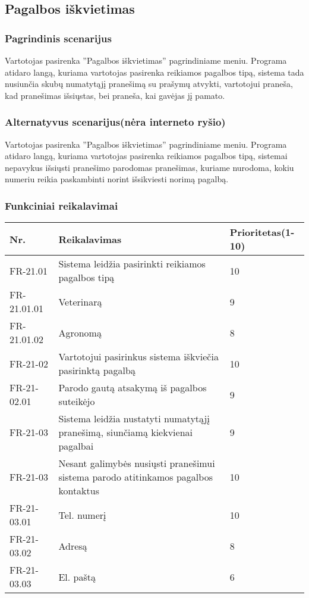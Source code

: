 \documentclass[oneside]{VUMIFPSkursinis}
\begin{document}
\subsection{Pagalbos iškvietimas}
	\subsubsection{Pagrindinis scenarijus}
	Vartotojas pasirenka ''Pagalbos iškvietimas'' pagrindiniame meniu. Programa atidaro langą, kuriama vartotojas pasirenka reikiamos pagalbos tipą, sistema tada nusiunčia skubų numatytąjį pranešimą su prašymų atvykti, vartotojui praneša, kad pranešimas išsiųstas, bei praneša, kai gavėjas jį pamato.
	\subsubsection{Alternatyvus scenarijus(nėra interneto ryšio)}
	Vartotojas pasirenka ''Pagalbos iškvietimas'' pagrindiniame meniu. Programa atidaro langą, kuriama vartotojas pasirenka reikiamos pagalbos tipą, sistemai nepavykus išsiųsti pranešimo parodomas pranešimas, kuriame nurodoma, kokiu numeriu reikia paskambinti norint išsikviesti norimą pagalbą.
	\subsubsection{Funkciniai reikalavimai}
	\begin{table}[htbp]
		\begin{tabularx}{1\textwidth}{ |P{2.5cm}|X|P{3cm }| }  \hline
			Nr. & Reikalavimas & Prioritetas(1-10) \\ \hline
			FR-21.01 & Sistema leidžia pasirinkti reikiamos pagalbos tipą & 10 \\ \hline
			FR-21.01.01 & Veterinarą & 9 \\ \hline
			FR-21.01.02 & Agronomą & 8 \\ \hline
			FR-21-02 & Vartotojui pasirinkus sistema iškviečia pasirinktą pagalbą & 10 \\ \hline	
			FR-21-02.01 & Parodo gautą atsakymą iš pagalbos suteikėjo & 9 \\ \hline
			FR-21-03 & Sistema leidžia nustatyti numatytąjį pranešimą, siunčiamą kiekvienai pagalbai & 9 \\ \hline	
			FR-21-03 & Nesant galimybės nusiųsti pranešimui sistema parodo atitinkamos pagalbos kontaktus & 10 \\ \hline	
			FR-21-03.01 & Tel. numerį & 10 \\ \hline	
			FR-21-03.02 & Adresą & 8 \\ \hline	
			FR-21-03.03 & El. paštą & 6 \\ \hline						
		\end{tabularx}
	\end{table}
\end{document}
